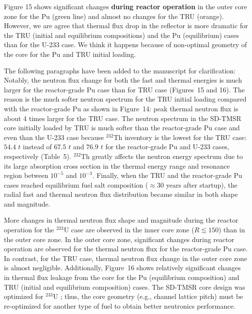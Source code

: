 \documentclass[answers,11pt]{exam}
\begin{document}
\begin{questions}
\begin{solution}
                Figure 15 shows 
				significant changes \textbf{during reactor operation} in the 
				outer core zone for the Pu (green line) and almost no changes 
				for the TRU (orange). However, we are agree that thermal flux 
				drop in the reflector is more dramatic for the TRU (initial 
				and equilibrium compositions) and the Pu (equilibrium) cases 
				than for the U-233 case. We think it happens because of 
				non-optimal geometry of the core for the Pu and TRU initial 
				loading.			
				
				The following paragraphs have been added to the manuscript for 
				clarification:\\
				
				Notably, the neutron flux change for both the fast and thermal 
				energies is much larger for the reactor-grade Pu case than for 
				TRU case (Figures~15 and 16). The reason is the much softer 
				neutron spectrum for the TRU initial loading compared with the 
				reactor-grade Pu as shown in Figure~14: peak thermal neutron 
				flux is about 4 times larger for the TRU case. The neutron 
				spectrum in the SD-TMSR core initially loaded by TRU is much 
				softer than the reactor-grade Pu case and even than the U-233 
				case because $^{232}$Th inventory is the lowest for the TRU 
				case: $54.4$ $t$ instead of $67.5$ $t$ and $76.9$ $t$ for the reactor-grade  
				Pu and U-233 cases, respectively (Table~5). $^{232}$Th greatly 
				affects the neutron energy spectrum due to its large 
				absorption cross section in the thermal energy range and 
				resonance region between $10^{-5}$ and $10^{-3}$. Finally, 
				when the TRU and the reactor-grade Pu cases reached 
				equilibrium fuel salt composition ($\approx 30$ years after 
				startup), the radial fast and thermal neutron flux 
				distribution became similar in both shape and magnitude.
				
				More changes in thermal neutron flux shape and magnitude 
				during the reactor operation for the $^{233}$U case are 
				observed in the inner core zone ($R\lesssim150$) than in the 
				outer core zone. In the outer core zone, significant changes 
				during reactor operation are observed for the thermal 
				neutron flux for the reactor-grade Pu case. In contrast, for 
				the TRU case, thermal neutron flux change in the outer core 
				zone is almost negligible. Additionally, 
				Figure~16 shows relatively significant changes in thermal flux 
				leakage from the core for the Pu (equilibrium composition) and 
				TRU (initial and equilibrium composition) cases. The SD-TMSR 
				core design was optimized for $^{233}$U  				
				\cite{li_optimization_2018}; thus, the core geometry (e.g., 
				channel lattice pitch) must be re-optimized for another type 
				of fuel to obtain better neutronics performance.
        \end{solution}


\end{questions}
\end{document}
